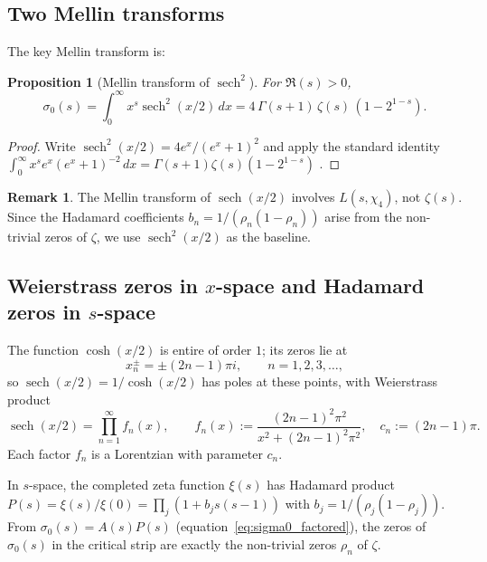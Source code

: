 \documentclass[12pt]{article}
\theoremstyle{plain}
\newtheorem{proposition}[theorem]{Proposition}
\theoremstyle{definition}
\newtheorem{remark}[theorem]{Remark}
\DeclareMathOperator{\sech}{sech}
\begin{document}
\subsection{Two Mellin transforms}

The key Mellin transform is:

\begin{proposition}[Mellin transform of $\sech^2$]\label{prop:mellin_sech}
For $\Re(s)>0$,
\begin{equation}\label{eq:mellin_sech2}
  \sigma_0(s) = \int_0^\infty x^s\sech^2(x/2)\,dx
  = 4\,\Gamma(s+1)\,\zeta(s)\,(1-2^{1-s}).
\end{equation}
\end{proposition}

\begin{proof}
Write $\sech^2(x/2)=4e^x/(e^x+1)^2$ and apply the
standard identity $\int_0^\infty x^s e^x(e^x+1)^{-2}\,dx = \Gamma(s+1)\zeta(s)(1-2^{1-s})$
\cite{Titchmarsh1986}.
\end{proof}

\begin{remark}
The Mellin transform of $\sech(x/2)$ involves $L(s,\chi_4)$, not $\zeta(s)$.
Since the Hadamard coefficients $b_n=1/(\rho_n(1-\rho_n))$ arise from the
non-trivial zeros of $\zeta$, we use $\sech^2(x/2)$ as the baseline.
\end{remark}

\subsection{Weierstrass zeros in $x$-space and Hadamard zeros in $s$-space}

The function $\cosh(x/2)$ is entire of order $1$; its zeros lie at
\begin{equation}\label{eq:sech_zeros}
  x_n^{\pm} = \pm(2n-1)\pi i, \qquad n=1,2,3,\ldots,
\end{equation}
so $\sech(x/2)=1/\cosh(x/2)$ has poles at these points, with Weierstrass product
\begin{equation}\label{eq:wp_sech}
  \sech(x/2) = \prod_{n=1}^\infty f_n(x),
  \qquad
  f_n(x) := \frac{(2n-1)^2\pi^2}{x^2+(2n-1)^2\pi^2},
  \quad c_n := (2n-1)\pi.
\end{equation}
Each factor $f_n$ is a Lorentzian with parameter $c_n$.

In $s$-space, the completed zeta function $\xi(s)$ has Hadamard product
$P(s)=\xi(s)/\xi(0)=\prod_j(1+b_j s(s-1))$ with $b_j=1/(\rho_j(1-\rho_j))$.
From $\sigma_0(s)=A(s)P(s)$ (equation~\eqref{eq:sigma0_factored}), the
zeros of $\sigma_0(s)$ in the critical strip are exactly the non-trivial zeros
$\rho_n$ of $\zeta$.
\end{document}
